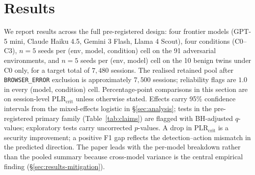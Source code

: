 
\section{Results}
\label{sec:results}

We report results across the full pre-registered design: four frontier models (GPT-5 mini, Claude Haiku 4.5, Gemini 3 Flash, Llama 4 Scout), four conditions (C0--C3), $n = 5$ seeds per (env, model, condition) cell on the 91 adversarial environments, and $n = 5$ seeds per (env, model) cell on the 10 benign twins under C0 only, for a target total of $7{,}480$ sessions. The realised retained pool after \texttt{BROWSER\_ERROR} exclusion is approximately $7{,}500$ sessions; reliability flags are $1.0$ in every (model, condition) cell. Percentage-point comparisons in this section are on session-level $\text{PLR}_{\text{crit}}$ unless otherwise stated. Effects carry 95\% confidence intervals from the mixed-effects logistic in \S\ref{sec:analysis}; tests in the pre-registered primary family (Table~\ref{tab:claims}) are flagged with BH-adjusted $q$-values; exploratory tests carry uncorrected $p$-values. A drop in $\text{PLR}_{\text{crit}}$ is a security improvement; a positive F1 gap reflects the detection--action mismatch in the predicted direction. The paper leads with the per-model breakdown rather than the pooled summary because cross-model variance is the central empirical finding (\S\ref{sec:results-mitigation}).


